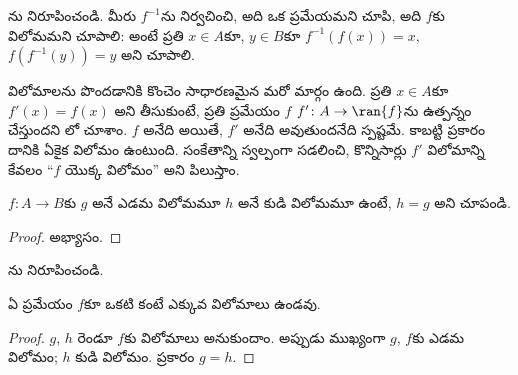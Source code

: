 \documentclass[../../../include/open-logic-section]{subfiles}
\begin{document}
\begin{prob}
ను నిరూపించండి.
మీరు $f^{-1}$ను నిర్వచించి, అది ఒక ప్రమేయమని చూపి,
అది $f$కు విలోమమని చూపాలి: అంటే ప్రతి $x \in A$కూ, $y \in B$కూ
$f^{-1}(f(x)) = x$, $f(f^{-1}(y)) = y$ అని చూపాలి.
\end{prob}

\begin{explain}
విలోమాలను పొందడానికి కొంచెం సాధారణమైన మరో మార్గం ఉంది.
ప్రతి $x \in A$కూ $f'(x) = f(x)$ అని తీసుకుంటే, ప్రతి ప్రమేయం $f$
 $f' \colon A \to \ran{f}$ను ఉత్పన్నం చేస్తుందని
లో చూశాం. $f$ అనేది  అయితే,
$f'$ అనేది  అవుతుందనేది స్పష్టమే.
కాబట్టి  ప్రకారం దానికి ఏకైక విలోమం ఉంటుంది.
సంకేతాన్ని స్వల్పంగా సడలించి, కొన్నిసార్లు $f'$ విలోమాన్ని
కేవలం ``$f$ యొక్క విలోమం'' అని పిలుస్తాం.
\end{explain}

\begin{prop}%
$f\colon A \to B$కు $g$ అనే ఎడమ విలోమమూ $h$ అనే కుడి విలోమమూ
ఉంటే, $h = g$ అని చూపండి.
\end{prop}

\begin{proof}
అభ్యాసం.
\end{proof}

\begin{prob}
ను నిరూపించండి.
\end{prob}

\begin{prop}
ఏ ప్రమేయం $f$కూ ఒకటి కంటే ఎక్కువ విలోమాలు ఉండవు.
\end{prop}

\begin{proof}
$g$, $h$ రెండూ $f$కు విలోమాలు అనుకుందాం.
అప్పుడు ముఖ్యంగా $g$, $f$కు ఎడమ విలోమం; $h$ కుడి విలోమం.
 ప్రకారం $g = h$.
\end{proof}
\end{document}
